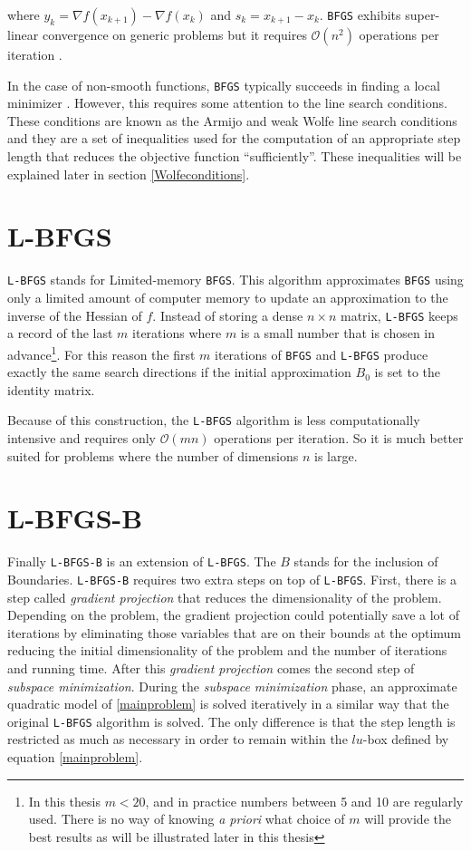 where $y_k = \nabla f(x_{k+1}) - \nabla f(x_k)$ and $s_k = x_{k+1} - x_k$.  \texttt{BFGS} exhibits super-linear convergence on generic problems but it requires $\mathcal{O}(n^2)$ operations per iteration \citep{nocedal}.

In the case of non-smooth functions, \texttt{BFGS} typically succeeds in finding a local minimizer \citep{overtonlewis}. However, this requires some attention to the line search conditions. These conditions are known as the Armijo and weak Wolfe line search conditions and they are a set of inequalities used for the computation of an appropriate step length that reduces the objective function ``sufficiently''. These inequalities will be explained later in section \ref{Wolfeconditions}.

\section{L-BFGS}

\texttt{L-BFGS} stands for Limited-memory \texttt{BFGS}. This algorithm approximates \texttt{BFGS} using only a limited amount of computer memory to update an approximation to the inverse of the Hessian of $f$. Instead of storing a dense $n \times n$ matrix, \texttt{L-BFGS} keeps a record of the last $m$ iterations where $m$ is a small number that is chosen in advance\footnote{In this thesis $m < 20$, and in practice numbers between 5 and 10 are regularly used. There is no way of knowing \emph{a priori} what choice of $m$ will provide the best results as will be illustrated later in this thesis}. For this reason the first $m$ iterations of \texttt{BFGS} and \texttt{L-BFGS} produce exactly the same search directions if the initial approximation $B_0$ is set to the identity matrix.

Because of this construction, the \texttt{L-BFGS} algorithm is less computationally intensive and requires only $\mathcal{O}(mn)$ operations per iteration. So it is much better suited for problems where the number of dimensions $n$ is large.

\section{L-BFGS-B}

Finally \texttt{L-BFGS-B} is an extension of \texttt{L-BFGS}. The $B$ stands for the inclusion of Boundaries.  \texttt{L-BFGS-B} requires two extra steps on top of \texttt{L-BFGS}. First, there is a step called \emph{gradient projection} that reduces the dimensionality of the problem. Depending on the problem, the gradient projection could potentially save a lot of iterations by eliminating those variables that are on their bounds at the optimum reducing the initial dimensionality of the problem and the number of iterations and running time. After this \emph{gradient projection} comes the second step of \emph{subspace minimization}. During the \emph{subspace minimization} phase, an approximate quadratic model of \eqref{mainproblem} is solved iteratively in a similar way that the original \texttt{L-BFGS} algorithm is solved. The only difference is that the step length is restricted as much as necessary in order to remain within the $lu$-box defined by equation \eqref{mainproblem}.


